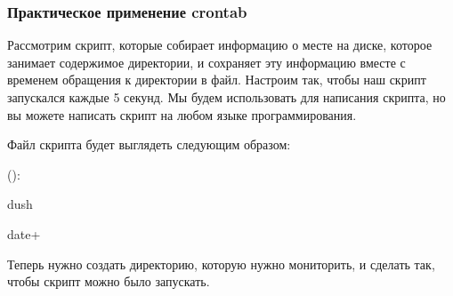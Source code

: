 \documentclass[letterpaper,10pt,russian]{sphinxmanual}
\begin{document}
\subsubsection{Практическое применение crontab}
\label{\detokenize{educational_materials/managers/content:id3}}
\sphinxAtStartPar
Рассмотрим скрипт, которые собирает информацию о месте на диске, которое занимает содержимое директории, и сохраняет эту информацию вместе с временем обращения к директории в файл. Настроим  так, чтобы наш скрипт запускался каждые 5 секунд. Мы будем использовать  для написания скрипта, но вы можете написать скрипт на любом языке программирования.

\sphinxAtStartPar
Файл скрипта  будет выглядеть следующим образом:

\sphinxAtStartPar
():

\begin{sphinxVerbatim}[commandchars=\\\{\}]



du\PYGZhy{}sh

date+

\PYGZgt{}\PYGZgt{}
\end{sphinxVerbatim}

\sphinxAtStartPar
Теперь нужно создать директорию, которую нужно мониторить, и сделать так, чтобы скрипт можно было запускать.
\end{document}
